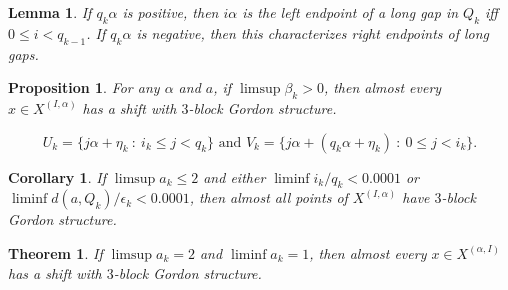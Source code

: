 \documentclass[10pt,a4paper]{amsart}
\newtheorem{lemma}{Lemma}
\newtheorem{proposition}{Proposition}
\newtheorem{corollary}{Corollary}
\newtheorem{theorem}{Theorem}
\begin{document}
\begin{lemma}\label{endpts}
If $q_k \alpha$ is positive, then $i\alpha$ is the left endpoint of a long gap in $Q_k$ iff $0 \leq i < q_{k-1}$. If $q_k \alpha$ is negative, then this characterizes right endpoints of long gaps. 
\end{lemma}

\begin{proposition}\label{longint}
For any $\alpha$ and $a$, if $\limsup \beta_k > 0$, then almost every $x \in X^{(I, \alpha)}$ has a shift with $3$-block Gordon structure.
\end{proposition}

\begin{equation}\label{uv}
U_k = \{j \alpha + \eta_k \ : \ i_k \leq j < q_k\} \textrm{ and } V_k = \{j \alpha + (q_k \alpha + \eta_k) \ : \ 0 \leq j < i_k\}.
\end{equation}

\begin{corollary}\label{bdaway}
If $\limsup a_k \leq 2$ and either $\liminf i_k/q_k < 0.0001$ or $\liminf d(a, Q_k)/\epsilon_k < 0.0001$, then almost all points of $X^{(I, \alpha)}$ have $3$-block Gordon structure.
\end{corollary}

\begin{theorem}\label{onetwo}
If $\limsup a_k = 2$ and $\liminf a_k = 1$, then almost every $x \in X^{(\alpha, I)}$ has a shift with $3$-block Gordon structure.
\end{theorem}
\end{document}
